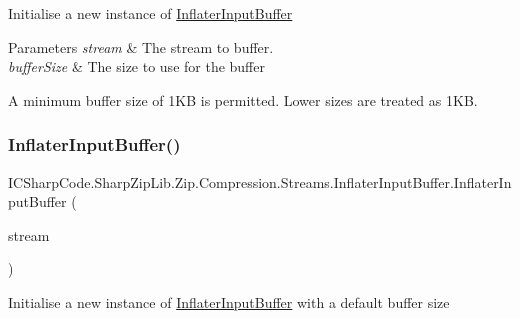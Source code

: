 Initialise a new instance of \hyperlink{class_i_c_sharp_code_1_1_sharp_zip_lib_1_1_zip_1_1_compression_1_1_streams_1_1_inflater_input_buffer}{Inflater\+Input\+Buffer} 


\begin{DoxyParams}{Parameters}
{\em stream} & The stream to buffer.\\
\hline
{\em buffer\+Size} & The size to use for the buffer\\
\hline
\end{DoxyParams}


A minimum buffer size of 1\+KB is permitted. Lower sizes are treated as 1\+KB.\mbox{\label{class_i_c_sharp_code_1_1_sharp_zip_lib_1_1_zip_1_1_compression_1_1_streams_1_1_inflater_input_buffer_a29ccbb3fa15cead58316762cfa37bd52}} 
\subsubsection{\texorpdfstring{Inflater\+Input\+Buffer()}{InflaterInputBuffer()}\hspace{0.1cm}{\footnotesize\ttfamily [3/4]}}
{\footnotesize\ttfamily I\+C\+Sharp\+Code.\+Sharp\+Zip\+Lib.\+Zip.\+Compression.\+Streams.\+Inflater\+Input\+Buffer.\+Inflater\+Input\+Buffer (\begin{DoxyParamCaption}\item[{Stream}]{stream }\end{DoxyParamCaption})\hspace{0.3cm}{\ttfamily [inline]}}



Initialise a new instance of \hyperlink{class_i_c_sharp_code_1_1_sharp_zip_lib_1_1_zip_1_1_compression_1_1_streams_1_1_inflater_input_buffer}{Inflater\+Input\+Buffer} with a default buffer size 


